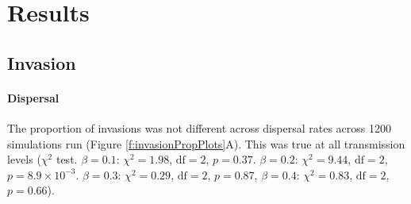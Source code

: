 





\section{Results}









































\subsection{Invasion}


\paragraph{Dispersal}


The proportion of invasions was not different across dispersal rates across 1200 simulations run (Figure \ref{f:invasionPropPlots}A).
This was true at all transmission levels ($\chi^2$ test. $\beta = 0.1$: $\chi^2 = 1.98$, $\text{df} = 2$, $p = 0.37$. $\beta = 0.2$: $\chi^2 = 9.44$, $\text{df} = 2$, $p = \ensuremath{8.9\times 10^{-3}}$. $\beta = 0.3$: $\chi^2 = 0.29$, $\text{df} = 2$, $p = 0.87$, $\beta = 0.4$: $\chi^2 = 0.83$, $\text{df} = 2$, $p = 0.66$).


